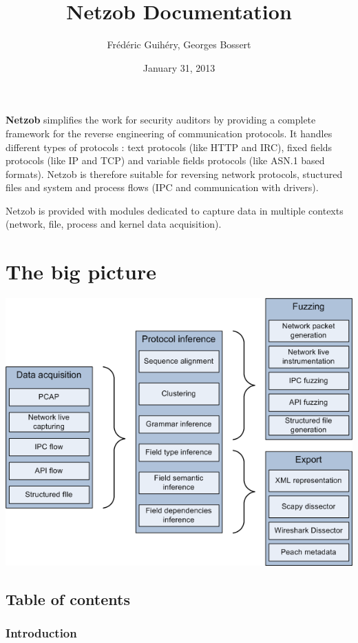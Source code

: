 \documentclass[letterpaper,10pt,english]{sphinxmanual}
\title{Netzob Documentation}
\date{January 31, 2013}
\author{Frédéric Guihéry, Georges Bossert}
\begin{document}
\maketitle
\tableofcontents
{}\label{index::doc}


\textbf{Netzob} simplifies the work for security auditors by providing a complete framework for the reverse engineering of communication protocols. It handles different types of protocols : text protocols (like HTTP and IRC), fixed fields protocols (like IP and TCP) and variable fields protocols (like ASN.1 based formats). Netzob is therefore suitable for reversing network protocols, stuctured files and system and process flows (IPC and communication with drivers).

Netzob is provided with modules dedicated to capture data in multiple contexts (network, file, process and kernel data acquisition).


\chapter{The big picture}
\label{index:welcome-to-netzob-s-documentation}\label{index:the-big-picture}
\includegraphics{netzob_archi.png}


\section{Table of contents}
\label{index:table-of-contents}

\subsection{Introduction}
\label{introduction/index:introduction}\label{introduction/index::doc}\label{introduction/index:id1}
\end{document}

